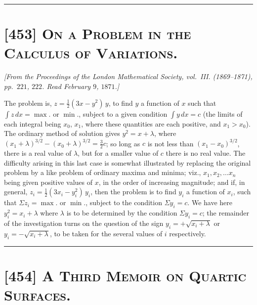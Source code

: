 \documentclass[11pt,a4paper]{article}
\begin{document}
\bigskip
\hrule
\bigskip

\section*{[453] \textsc{On a Problem in the Calculus of Variations.}}

\begin{center}
\textit{[From the Proceedings of the London Mathematical Society, vol.\ III.
(1869--1871), pp.\ $221$, $222$. Read February $9$, $1871$.]}
\end{center}

\medskip

The problem is, $z = \tfrac{1}{2}(3x - y^2)\, y$, to find $y$ a function of
$x$ such that $\int z\, dx = \max$. or $\min$., subject to a given condition
$\int y\, dx = c$ (the limits of each integral being $x_0$, $x_1$, where
these quantities are each positive, and $x_1 > x_0$). The ordinary method
of solution gives $y^2 = x + \lambda$, where
$(x_1 + \lambda)^{3/2} - (x_0 + \lambda)^{3/2} = \tfrac{3}{2} c$; so long
as $c$ is not less than $(x_1 - x_0)^{3/2}$, there is a real value of
$\lambda$, but for a smaller value of $c$ there is no real value. The
difficulty arising in this last case is somewhat illustrated by replacing
the original problem by a like problem of ordinary maxima and minima; viz.,
$x_1, x_2, \dotsc x_n$ being given positive values of $x$, in the order
of increasing magnitude; and if, in general, $z_i = \tfrac{1}{2}(3 x_i - y_i^2)\, y_i$,
then the problem is to find $y_i$ a function of $x_i$, such that
$\Sigma z_i = \max$. or $\min$., subject to the condition $\Sigma y_i = c$.
We have here $y_i^2 = x_i + \lambda$ where $\lambda$ is to be determined
by the condition $\Sigma y_i = c$; the remainder of the investigation
turns on the question of the sign $y_i = + \sqrt{x_i + \lambda}$ or
$y_i = - \sqrt{x_i + \lambda}$, to be taken for the several values of $i$
respectively.

\bigskip
\hrule
\bigskip

\section*{[454] \textsc{A Third Memoir on Quartic Surfaces.}}
\end{document}
